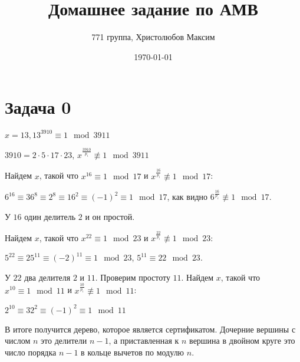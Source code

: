 \documentclass[a4paper,12pt]{article} %
\author{771 группа, Христолюбов Максим}
\title{Домашнее задание по АМВ}
\date{\today}
\begin{document}
	
	\maketitle

\section{Задача 0}
\hspace{5mm}
$x=13, 13^3910\equiv 1 \mod 3911$

$3910=2\cdot 5\cdot 17\cdot 23$, $x^{\frac{3910}{p_i}}\not\equiv 1 \mod 3911$

Найдем $x$, такой что $x^{16}\equiv 1 \mod 17$ и $x^{\frac{16}{p_i}}\not\equiv 1 \mod 17$:

$6^{16}\equiv 36^8\equiv 2^8\equiv 16^2\equiv (-1)^2\equiv 1 \mod 17$, как видно $6^{\frac{16}{p_i}}\not\equiv 1 \mod 17$.

У $16$ один делитель $2$ и он простой.

Найдем $x$, такой что $x^{22}\equiv 1 \mod 23$ и $x^{\frac{22}{p_i}}\not\equiv 1 \mod 23$:

$5^{22}\equiv 25^{11}\equiv (-2)^{11}\equiv 1\mod 23$, $5^{11}\equiv 22\mod 23$.

У $22$ два делителя $2$ и $11$. Проверим простоту $11$. Найдем $x$, такой что $x^{10}\equiv 1 \mod 11$ и $x^{\frac{10}{p_i}}\not\equiv 1 \mod 11$:

$2^{10}\equiv 32^2\equiv (-1)^2\equiv 1\mod 11$

В итоге получится дерево, которое является сертификатом. Дочерние вершины с числом $n$ это делители $n-1$, а приставленная к $n$ вершина в двойном круге это число порядка $n-1$ в кольце вычетов по модулю $n$.
\end{document}
